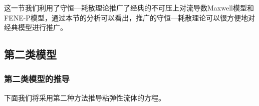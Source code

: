 	这一节我们利用了守恒—耗散理论推广了经典的不可压上对流导数Maxwell模型和FENE-P模型，通过本节的分析可以看出，推广的守恒—耗散理论可以很方便地对经典模型进行推广。

	\subsection{第二类模型}
	\subsubsection{第二类模型的推导}
	下面我们将采用第二种方法推导粘弹性流体的方程。

